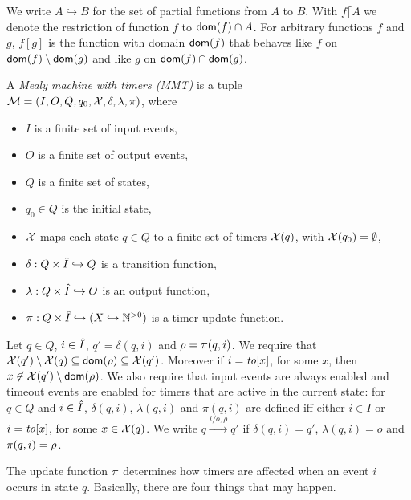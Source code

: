 We write $A \hookrightarrow B$ for the set of partial functions from $A$ to $B$.
With $f \lceil A$ we denote the restriction of function $f$ to ${\textsf{dom}}(f) \cap A$.
For arbitrary functions $f$ and $g$, $f [g]$ is the function with domain ${\textsf{dom}}(f)$ that behaves like $f$
on ${\textsf{dom}}(f) \setminus {\textsf{dom}}(g)$ and like $g$ on ${\textsf{dom}}(f) \cap {\textsf{dom}}(g)$.

\begin{definition}
\label{def:MMT}
A \emph{Mealy machine with timers (MMT)} is a tuple
\\
${\cal M} = (I, O, Q, q_0, \mathcal{X}, \delta, \lambda, \pi)$, where
\begin{itemize}
\item
$I$ is a finite set of input events,
\item
$O$ is a finite set of output events, 
\item
$Q$ is a finite set of states,
\item
$q_0 \in Q$ is the initial state,
\item
$\mathcal{X}$ maps each state $q \in Q$ to a finite set of timers $\mathcal{X}(q)$, with $\mathcal{X}(q_0) = \emptyset$,
\item
$\delta: Q \times \hat{I} \hookrightarrow  Q$ is a transition function,
\item
$\lambda: Q \times \hat{I} \hookrightarrow O$ is an output function, 
\item
$\pi : Q \times \hat{I} \hookrightarrow (X \hookrightarrow {\mathbb N}^{>0})$ is a timer update function.
\end{itemize}
Let $q \in Q$, $i \in \hat{I}$, $q'=\delta(q,i)$ and $\rho=\pi(q,i)$. 
We require that $\mathcal{X}(q') \setminus \mathcal{X}(q) \subseteq {\textsf{dom}}(\rho) \subseteq\mathcal{X}(q')$. Moreover
  if $i=\mathit{to}[x]$, for some $x$, then $x \not\in \mathcal{X}(q') \setminus {\textsf{dom}}(\rho)$.
%
We also require that input events are always enabled and timeout events are enabled
for timers that are active in the current state:
for $q \in Q$ and $i \in \hat{I}$,  $\delta(q,i)$, $\lambda(q,i)$ and $\pi(q,i)$ are defined iff either
$i \in I$ or $i=\mathit{to}[x]$, for some $x \in\mathcal{X}(q)$.
We write $q \xrightarrow{i/o,\rho} q'$ if $\delta(q,i) = q'$, $\lambda(q,i)= o$ and $\pi(q,i) = \rho$.
\end{definition}
The update function $\pi$ determines how timers are affected when an event $i$ occurs in state $q$.
Basically, there are four things that may happen.
